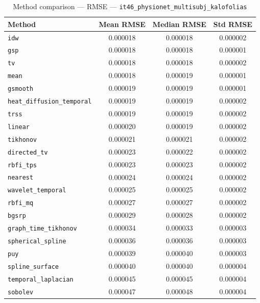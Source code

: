 \begin{table}[ht]
\centering
\caption{Method comparison — RMSE — \texttt{it46_physionet_multisubj_kalofolias}}
\label{tab:rmse_it46_physionet_multisubj_kalofolias}
\begin{tabular}{lccc}
\hline
Method & Mean RMSE & Median RMSE & Std RMSE \\
\hline
\texttt{idw} & 0.000018 & 0.000018 & 0.000002 \\
\texttt{gsp} & 0.000018 & 0.000018 & 0.000001 \\
\texttt{tv} & 0.000018 & 0.000018 & 0.000002 \\
\texttt{mean} & 0.000018 & 0.000019 & 0.000001 \\
\texttt{gsmooth} & 0.000019 & 0.000019 & 0.000001 \\
\texttt{heat_diffusion_temporal} & 0.000019 & 0.000019 & 0.000002 \\
\texttt{trss} & 0.000019 & 0.000019 & 0.000002 \\
\texttt{linear} & 0.000020 & 0.000019 & 0.000002 \\
\texttt{tikhonov} & 0.000021 & 0.000021 & 0.000002 \\
\texttt{directed_tv} & 0.000023 & 0.000022 & 0.000002 \\
\texttt{rbfi_tps} & 0.000023 & 0.000023 & 0.000002 \\
\texttt{nearest} & 0.000024 & 0.000024 & 0.000002 \\
\texttt{wavelet_temporal} & 0.000025 & 0.000025 & 0.000002 \\
\texttt{rbfi_mq} & 0.000027 & 0.000027 & 0.000002 \\
\texttt{bgsrp} & 0.000029 & 0.000028 & 0.000002 \\
\texttt{graph_time_tikhonov} & 0.000034 & 0.000033 & 0.000003 \\
\texttt{spherical_spline} & 0.000036 & 0.000036 & 0.000003 \\
\texttt{puy} & 0.000039 & 0.000040 & 0.000003 \\
\texttt{spline_surface} & 0.000040 & 0.000040 & 0.000004 \\
\texttt{temporal_laplacian} & 0.000045 & 0.000045 & 0.000004 \\
\texttt{sobolev} & 0.000047 & 0.000048 & 0.000004 \\
\hline
\end{tabular}
\end{table}
